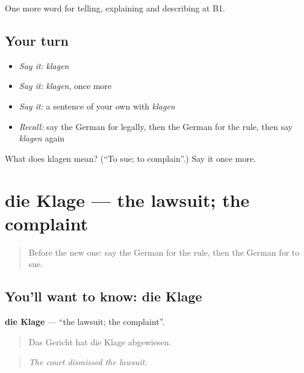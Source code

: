 \begin{grammarlens}[title={What you've built}]
One more word for telling, explaining and describing at B1.
\end{grammarlens}

\subsection*{Your turn}
\begin{itemize}
\raggedright
  \item \emph{Say it:} \emph{klagen}
  \item \emph{Say it:} \emph{klagen}, once more
  \item \emph{Say it:} a sentence of your own with \emph{klagen}
  \item \emph{Recall:} say the German for legally, then the German for the rule, then say \emph{klagen} again
\end{itemize}

\begin{tcolorbox}[breakable,colback=teal!4,colframe=teal!35!black,title={Before you move on}]
What does klagen mean? (\textquotedblleft{}To sue; to complain\textquotedblright{}.) Say it once more.
\end{tcolorbox}
\section[die Klage]{die Klage — the lawsuit; the complaint}

\label{lesson:GE-C386-klage}



\begin{quote}
Before the new one: say the German for the rule, then the German for to sue.
\end{quote}

\subsection*{You'll want to know: die Klage}
\textbf{die Klage} — \textquotedblleft{}the lawsuit; the complaint\textquotedblright{}.

\begin{quote}
Das Gericht hat die Klage abgewiesen.
\end{quote}

\begin{quote}
\emph{The court dismissed the lawsuit.}
\end{quote}

